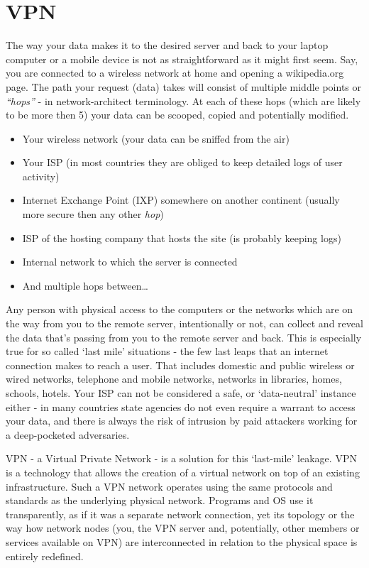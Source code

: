 \section{VPN}

The way your data makes it to the desired server and back to your laptop
computer or a mobile device is not as straightforward as it might first
seem. Say, you are connected to a wireless network at home and opening a
wikipedia.org page. The path your request (data) takes will consist of
multiple middle points or \emph{``hops''} - in network-architect
terminology. At each of these hops (which are likely to be more then 5)
your data can be scooped, copied and potentially modified.

\begin{itemize}
\item
  Your wireless network (your data can be sniffed from the air)
\item
  Your ISP (in most countries they are obliged to keep detailed logs of
  user activity)
\item
  Internet Exchange Point (IXP) somewhere on another continent (usually
  more secure then any other \emph{hop})
\item
  ISP of the hosting company that hosts the site (is probably keeping
  logs)
\item
  Internal network to which the server is connected
\item
  And multiple hops between\ldots{}
\end{itemize}
Any person with physical access to the computers or the networks which
are on the way from you to the remote server, intentionally or not, can
collect and reveal the data that's passing from you to the remote server
and back. This is especially true for so called `last mile' situations -
the few last leaps that an internet connection makes to reach a user.
That includes domestic and public wireless or wired networks, telephone
and mobile networks, networks in libraries, homes, schools, hotels. Your
ISP can not be considered a safe, or `data-neutral' instance either - in
many countries state agencies do not even require a warrant to access
your data, and there is always the risk of intrusion by paid attackers
working for a deep-pocketed adversaries.

VPN - a Virtual Private Network - is a solution for this `last-mile'
leakage. VPN is a technology that allows the creation of a virtual
network on top of an existing infrastructure. Such a VPN network
operates using the same protocols and standards as the underlying
physical network. Programs and OS use it transparently, as if it was a
separate network connection, yet its topology or the way how network
nodes (you, the VPN server and, potentially, other members or services
available on VPN) are interconnected in relation to the physical space
is entirely redefined.

